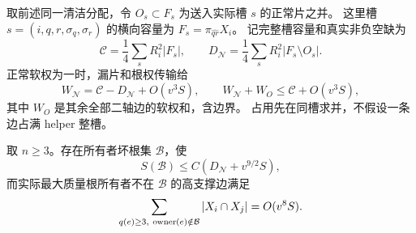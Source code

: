 取前述同一清洁分配，令 \(O_s\subset F_s\) 为送入实际槽 \(s\) 的正常片之并。
这里槽 \(s=(i,q,r,\sigma_q,\sigma_r)\) 的横向容量为
\(F_s=\pi_{\widehat{qr}}X_i\)。
记完整槽容量和真实非负空缺为
\begin{equation}\label{eighth:slot-deficit}
 \mathcal C=\frac14\sum_sR_i^2|F_s|,\qquad
 D_{\mathcal N}=\frac14\sum_sR_i^2|F_s\setminus O_s|.
\end{equation}
正常软权为一时，漏片和根权传输给
\begin{equation}\label{eighth:slot-identities}
 W_{\mathcal N}=\mathcal C-D_{\mathcal N}+O(v^3S),\qquad
 W_{\mathcal N}+W_O\le\mathcal C+O(v^3S),
\end{equation}
其中 \(W_O\) 是其余全部二轴边的软权和，含边界。
占用先在同槽求并，不假设一条边占满 helper 整槽。

\begin{lemma}[槽覆盖识别高支撑目标]\label{eighth:good-slots}
取 \(n\ge3\)。存在所有者坏根集 \(\mathcal B\)，使
\begin{equation}\label{eighth:bad-root}
 S(\mathcal B)\le C(D_{\mathcal N}+v^{9/2}S),
\end{equation}
而实际最大质量根所有者不在 \(\mathcal B\) 的高支撑边满足
\begin{equation}\label{eighth:good-high}
 \sum_{q(e)\ge3,\ {\rm owner}(e)\notin\mathcal B}|X_i\cap X_j|=O(v^8S).
\end{equation}
\end{lemma}
